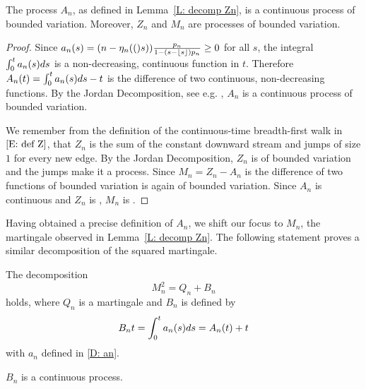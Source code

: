 \begin{corollary}
	The process $A_n$, as defined in Lemma~\ref{L: decomp Zn}, is a continuous process of bounded variation.
	Moreover, $Z_n$ and $M_n$ are \cadlaq{} processes of bounded variation.
\end{corollary}

\begin{proof}
	Since $a_n(s) = (n - \eta_n(()s)) \frac{p_n}{1-(s-\lfloor s\rfloor)p_n} \geq 0$ for all $s$,
	the integral $\int_{0}^{t}a_n(s)ds$ is a non-decreasing, continuous function in $t$.
	Therefore $A_n(t) = \int_{0}^{t}a_n(s)ds -t$ is the difference of two continuous, non-decreasing functions.
	By the Jordan Decomposition, see e.g. \cite{Mikosch2009}, $A_n$ is a continuous process of bounded variation.
	
	We remember from the definition of the continuous-time breadth-first walk in $\eqref{E: def Z}$,
	that $Z_n$ is the sum of the constant downward stream and jumps of size $1$ for every new edge.
	By the Jordan Decomposition, $Z_n$ is of bounded variation and the jumps make it a \cadlaq{} process.
	Since $M_n = Z_n - A_n$ is the difference of two functions of bounded variation is again of bounded variation.
	Since $A_n$ is continuous and $Z_n$ is \cadlaq{}, $M_n$ is \cadlaq{}.
\end{proof}



Having obtained a precise definition of $A_n$, we shift our focus to $M_n$, the martingale observed in Lemma~\ref{L: decomp Zn}.
The following statement proves a similar decomposition of the squared martingale.

\begin{lemma} \label{L: decomp Mn}
	The decomposition
	\begin{equation} \label{E: decomp Mn}
	M_n^2 = Q_n + B_n
	\end{equation}
	holds, where $Q_n$ is a martingale and $B_n$ is defined by 
	\begin{equation} \label{D: Bn}
	B_n{t} = \int_{0}^{t} a_n(s)ds = A_n(t) + t
	\end{equation}
	with $a_n$ defined in \eqref{D: an}.
\end{lemma}
\begin{note} \label{N: decomp Mn}
	$B_n$ is a continuous process.
\end{note}

